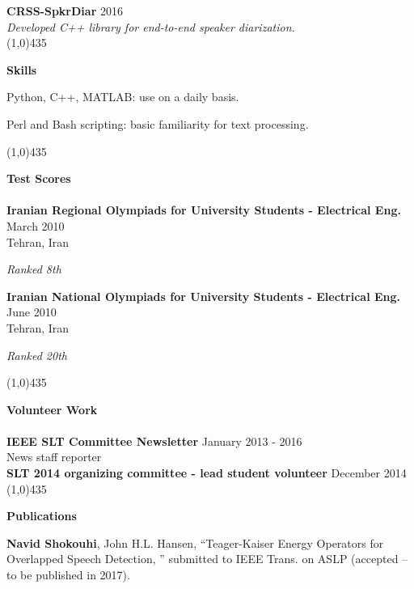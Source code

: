 \documentclass[doublespacing]{utdthesis}
\begin{document}
\begin{vita}
{\bf CRSS-SpkrDiar} \hfill { 2016}\\
{\it Developed C++ library for end-to-end speaker diarization.}\\
\line(1,0){435}

\textbf{\sc Skills\\} 
\begin{list2}
	\item Python, C++, MATLAB: use on a daily basis.
	\item Perl and Bash scripting: basic familiarity for text processing.
\end{list2}
\vspace{0mm}
\line(1,0){435}

\textbf{\sc Test Scores\\\\}
{\bf Iranian Regional Olympiads for University Students - Electrical Eng.} \hfill {March 2010}\\
Tehran, Iran
\begin{list1}
	\item[] {\it Ranked 8th}
\end{list1}
\vspace{-0mm}
{\bf Iranian National Olympiads for University Students - Electrical Eng.} \hfill {June 2010}\\
Tehran, Iran
\begin{list1}
	\vspace{-0mm}
	\item[] {\it Ranked 20th}
\end{list1}
\line(1,0){435}
\vspace{0mm}

\textbf{\sc Volunteer Work\\\\}
\vspace{0mm}
{\bf IEEE SLT Committee Newsletter} \hfill {January 2013 - 2016}\\
News staff reporter\\

{\bf SLT 2014 organizing committee - lead student volunteer} \hfill {December 2014}\\
\vspace{0mm}
\line(1,0){435}

\textbf{\sc Publications\\}

{\bf Navid Shokouhi}, John H.L. Hansen, ``Teager-Kaiser Energy Operators for Overlapped Speech Detection, '' submitted to IEEE Trans. on ASLP (accepted -- to be published in 2017). \\


\end{vita}
\end{document}
